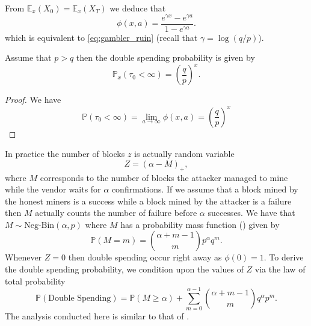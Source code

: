 From $\mathbb{E}_x(X_0) =\mathbb{E}_x(X_T)$ we deduce that 
$$
\phi(x,a) = \frac{e^{\gamma x} - e^{\gamma a}}{1- e^{\gamma a}}.
$$
which is equivalent to \eqref{eq:gambler_ruin} (recall that $\gamma =\log(q/p)$). 
\begin{coro}
Assume that $p>q$ then the double spending probability is given by 
$$
\mathbb{P}_x(\tau_0 <\infty) =\left(\frac{q}{p}\right)^x.
$$
\end{coro}
\begin{proof}
We have
$$
\mathbb{P}(\tau_0 <\infty) = \underset{a\rightarrow \infty}{\lim}\phi(x,a) = \left(\frac{q}{p}\right)^x
$$
\end{proof}

In practice the number of blocks $z$ is actually random variable 
$$
Z = (\alpha -M)_+,
$$ 
where $M$ corresponds to the number of blocks the attacker managed to mine while the vendor waits for $\alpha$ confirmations. If we assume that a block mined by the honest miners is a success while a block mined by the attacker is a failure then $M$ actually counts the number of failure before $\alpha$ successes. We have that $M\sim \text{Neg-Bin}(\alpha, p)$ where $M$ has a probability mass function (\pmf) given by 
$$
\mathbb{P}(M = m) = \binom{\alpha+m-1}{m}p^\alpha q^m.
$$
Whenever $Z = 0$ then double spending occur right away as $\phi(0) =1$. To derive the double spending probability, we condition upon the values of $Z$ via the law of total probability 
$$
\mathbb{P}( \text{Double Spending}) = \mathbb{P}(M\geq \alpha)+\sum_{m = 0}^{\alpha-1}\binom{\alpha+m-1}{m}q^\alpha p^m.
$$
The analysis conducted here is similar to that of \citet{rosenfeld2014analysis}.
